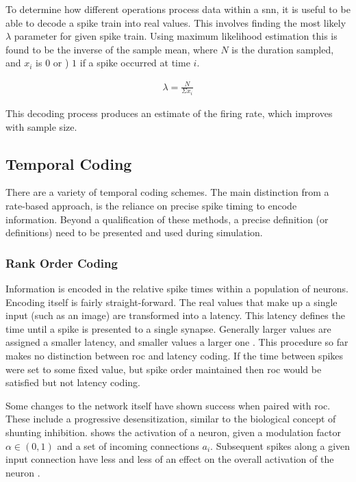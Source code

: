     
    
    To determine how different operations process data within a \gls{snn}, it is
    useful to be able to decode a spike train into real values. This involves
    finding the most likely $\lambda$ parameter for given spike train. Using
    maximum likelihood estimation this is found to be the inverse of the sample
    mean, where $N$ is the duration sampled, and $x_i$ is $0$ or ) $1$ if a
    spike occurred at time $i$.
    
    \begin{align}
        \lambda = \frac{N}{\Sigma x_i}
    \end{align}
    
    This decoding process produces an estimate of the firing rate, which
    improves with sample size.
    
    \subsection{Temporal Coding}
    There are a variety of temporal coding schemes. The main distinction from a
    rate-based approach, is the reliance on precise spike timing to encode
    information. Beyond a qualification of these methods, a precise definition
    (or definitions) need to be presented and used during simulation.
    
    \subsubsection{Rank Order Coding}
    Information is encoded in the relative spike times within a population of
    neurons. Encoding itself is fairly straight-forward. The real values that
    make up a single input (such as an image) are transformed into a
    latency. This latency defines the time until a spike is presented to a
    single synapse. Generally larger values are assigned a smaller latency, and
    smaller values a larger one \parencite{delorme_2001}. This procedure so far
    makes no distinction between \gls{roc} and latency coding. If the time
    between spikes were set to some fixed value, but spike order maintained then
    \gls{roc} would be satisfied but not latency coding.
    
    Some changes to the network itself have shown success when paired with
    \gls{roc}. These include a progressive desensitization, similar to the
    biological concept of shunting inhibition.  shows the
    activation of a neuron, given a modulation factor $\alpha \in (0,1)$ and a
    set of incoming connections $a_i$. Subsequent spikes along a given input
    connection have less and less of an effect on the overall activation of the
    neuron \parencite{delorme_2001}.
    
